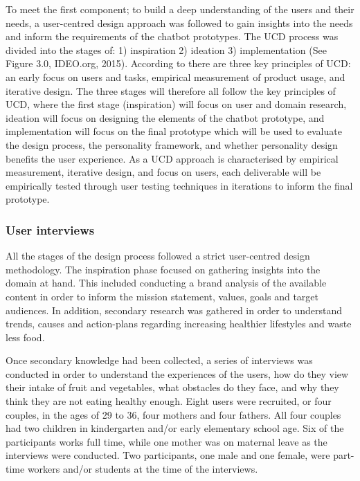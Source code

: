 To meet the first component; to build a deep understanding of the users and their needs, a user-centred design approach was followed to gain insights into the needs and inform the requirements of the chatbot prototypes. The UCD process was divided into the stages of:  1) inspiration 2) ideation 3) implementation (See Figure 3.0, IDEO.org, 2015). According to \cite{Gould1985} there are three key principles of UCD: an early focus on users and tasks, empirical measurement of product usage, and iterative design. The three stages will therefore all follow the key principles of UCD, where the first stage (inspiration) will focus on user and domain research, ideation will focus on designing the elements of the chatbot prototype, and implementation will focus on the final prototype which will be used to evaluate the design process, the personality framework, and whether personality design benefits the user experience. As a UCD approach is characterised by empirical measurement, iterative design, and focus on users, each deliverable will be empirically tested through user testing techniques in iterations to inform the final prototype.

\vspace{2,5mm} %

    \subsubsection{User interviews}
    
   All the stages of the design process followed a strict user-centred design methodology. The inspiration phase focused on gathering insights into the domain at hand. This included conducting a brand analysis of the available content in order to inform the mission statement, values, goals and target audiences. In addition, secondary research was gathered in order to understand trends, causes and action-plans regarding increasing healthier lifestyles and waste less food.
   
   Once secondary knowledge had been collected, a series of interviews was conducted in order to understand the experiences of the users, how do they view their intake of fruit and vegetables, what obstacles do they face, and why they think they are not eating healthy enough. Eight users were recruited, or four couples, in the ages of 29 to 36, four mothers and four fathers. All four couples had two children in kindergarten and/or early elementary school age. Six of the participants works full time, while one mother was on maternal leave as the interviews were conducted. Two participants, one male and one female, were part-time workers and/or students at the time of the interviews.
   
